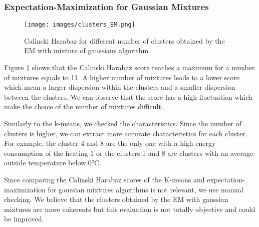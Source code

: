 \documentclass{llncs}
\begin{document}
\subsubsection{Expectation-Maximization for Gaussian Mixtures}

\begin{figure}[tb]
\centering
\texttt{[image: images/clusters\_EM.png]}
\caption{Calinski Harabaz for different number of clusters obtained by the EM with mixture of gaussians algorithm}
\label{fig:em-scores}
\end{figure}

Figure \ref{fig:em-scores} shows that the Calinski Harabaz score reaches a maximum for a number of mixtures equals to 11. A higher number of mixtures leads to a lower score which mean a larger dispersion within the clusters and a smaller dispersion between the clusters. We can observe that the score has a high fluctuation which make the choice of the number of mixtures difficult.

Similarly to the k-means, we checked the characteristics. Since the number of clusters is higher, we can extract more accurate characteristics for each cluster. For example, the cluster 4 and 8 are the only one with a high energy consumption of the heating 1 or the clusters 1 and 8 are clusters with an average outside temperature below 0°C.  

Since comparing the Calinski Harabaz scores of the K-means and expectation-maximization for gaussian mixtures algorithms is not relevant, we use manual checking. We believe that the clusters obtained by the EM with gaussian mixtures are more coherents but this evaluation is not totally objective and could be improved.


%
%
\begin{thebibliography}{5}
%


\end{thebibliography}
\end{document}
